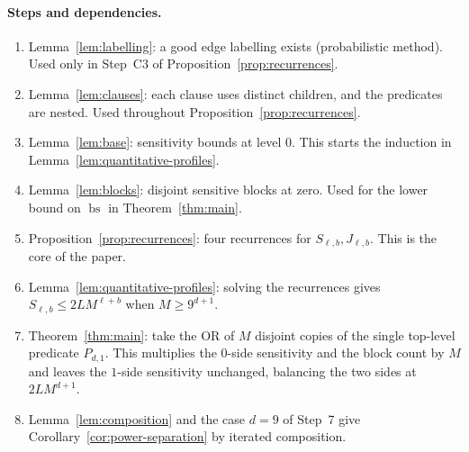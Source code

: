 \documentclass[11pt]{article}
\newcommand{\bs}{\operatorname{bs}}
\theoremstyle{definition}
\theoremstyle{remark}
\begin{document}
\paragraph{Steps and dependencies.}
\begin{enumerate}[leftmargin=*]
\item Lemma~\ref{lem:labelling}: a good edge labelling exists (probabilistic method). Used only in Step~C3 of Proposition~\ref{prop:recurrences}.
\item Lemma~\ref{lem:clauses}: each clause uses distinct children, and the predicates are nested. Used throughout Proposition~\ref{prop:recurrences}.
\item Lemma~\ref{lem:base}: sensitivity bounds at level \(0\). This starts the induction in Lemma~\ref{lem:quantitative-profiles}.
\item Lemma~\ref{lem:blocks}: disjoint sensitive blocks at zero. Used for the lower bound on \(\bs\) in Theorem~\ref{thm:main}.
\item Proposition~\ref{prop:recurrences}: four recurrences for \(S_{\ell,b},J_{\ell,b}\). This is the core of the paper.
\item Lemma~\ref{lem:quantitative-profiles}: solving the recurrences gives \(S_{\ell,b}\le2LM^{\ell+b}\) when \(M\ge9^{d+1}\).
\item Theorem~\ref{thm:main}: take the OR of \(M\) disjoint copies of the single top-level predicate \(P_{d,1}\). This multiplies the \(0\)-side sensitivity and the block count by \(M\) and leaves the \(1\)-side sensitivity unchanged, balancing the two sides at \(2LM^{d+1}\).
\item Lemma~\ref{lem:composition} and the case \(d=9\) of Step~7 give Corollary~\ref{cor:power-separation} by iterated composition.
\end{enumerate}
\end{document}
